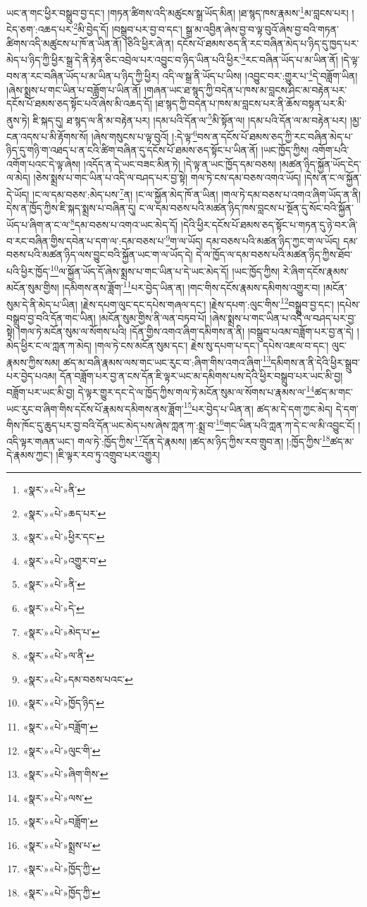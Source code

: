 ཡང་ན་གང་ཕྱིར་བསྒྲུབ་བྱ་དང་། །གཏན་ཚིགས་འདི་མཚུངས་སྒྲ་ཡོད་མིན། །ཐ་སྙད་ཁས་རྣམས་\footnote{«སྣར་»«པེ་»ནི་}མ་བླངས་པར། །ངེད་ཅག་:འཆད་པར་\footnote{«སྣར་»«པེ་»ཆད་པར་}མི་བྱེད་དོ། །བསྒྲུབ་པར་བྱ་བ་དང་། སྒྲ་མ་འབྱིན་ཞེས་བྱ་བ་ལྟ་བུའོ་ཞེས་བྱ་བའི་གཏན་ཚིགས་འདི་མཚུངས་པ་ཁོ་ན་ཡིན་ནོ། །ཅིའི་ཕྱིར་ཞེ་ན། དངོས་པོ་ཐམས་ཅད་ནི་རང་བཞིན་མེད་པ་ཉིད་དུ་ཁྱད་པར་མེད་པ་ཉིད་ཀྱི་ཕྱིར་སྒྲ་དེ་ནི་རྟེན་ཅིང་འབྲེལ་པར་འབྱུང་བ་ཉིད་ཡིན་པའི་ཕྱིར་\footnote{«སྣར་»«པེ་»ཕྱིར་དང་}རང་བཞིན་ཡོད་པ་མ་ཡིན་ནོ། །དེ་ལྟ་བས་ན་རང་བཞིན་ཡོད་པ་མ་ཡིན་པ་ཉིད་ཀྱི་ཕྱིར། འདི་ལ་སྒྲ་ནི་ཡོད་པ་ཡིས། །འབྱུང་བར་:གྱུར་པ་\footnote{«སྣར་»«པེ་»འགྱུར་བ་}དེ་བཟློག་ཡིན། །ཞེས་སྨྲས་པ་གང་ཡིན་པ་བཟློག་པ་ཡིན་ནོ། །གཞན་ཡང་ཐ་སྙད་ཀྱི་བདེན་པ་ཁས་མ་བླངས་ཤིང་མ་བརྟེན་པར་དངོས་པོ་ཐམས་ཅད་སྟོང་པའོ་ཞེས་མི་འཆད་དོ། །ཐ་སྙད་ཀྱི་བདེན་པ་ཁས་མ་བླངས་པར་ནི་ཆོས་བསྟན་པར་མི་ནུས་ཏེ། ཇི་སྐད་དུ། ཐ་སྙད་ལ་ནི་མ་བརྟེན་པར། །དམ་པའི་དོན་ལ་\footnote{«སྣར་»«པེ་»ནི་}མི་སྟོན་ལ། །དམ་པའི་དོན་ལ་མ་བརྟེན་པར། །མྱ་ངན་འདས་པ་མི་རྟོགས་སོ། །ཞེས་གསུངས་པ་ལྟ་བུའོ། །:དེ་ལྟ་\footnote{«སྣར་»«པེ་»དེ་}བས་ན་དངོས་པོ་ཐམས་ཅད་ཀྱི་རང་བཞིན་མེད་པ་ཉིད་དུ་གཉི་ག་འཐད་པ་ན་ངའི་ཚིག་བཞིན་དུ་དངོས་པོ་ཐམས་ཅད་སྟོང་པ་ཡིན་ནོ། །ཡང་ཁྱོད་ཀྱིས། འགོག་པའི་འགོག་པའང་དེ་ལྟ་ཞེས། །འདོད་ན་དེ་ཡང་བཟང་མིན་ཏེ། །དེ་ལྟ་ན་ཡང་ཁྱོད་དམ་བཅས། །མཚན་ཉིད་སྐྱོན་ཡོད་ངེད་ལ་མེད། །ཅེས་སྨྲས་པ་གང་ཡིན་པ་འདི་ལ་བཤད་པར་བྱ་སྟེ། གལ་ཏེ་ངས་དམ་བཅས་འགའ་ཡོད། །དེས་ན་ང་ལ་སྐྱོན་དེ་ཡོད། །ང་ལ་དམ་བཅས་:མེད་པས་\footnote{«སྣར་»«པེ་»མེད་པ་}ན། །ང་ལ་སྐྱོན་མེད་ཁོ་ན་ཡིན། །གལ་ཏེ་དམ་བཅས་པ་འགའ་ཞིག་ཡོད་ན་ནི། དེས་ན་ཁྱོད་ཀྱིས་ཇི་སྐད་སྨྲས་པ་བཞིན་དུ། ང་ལ་དམ་བཅས་པའི་མཚན་ཉིད་ཁས་བླངས་པ་སྔོན་དུ་སོང་བའི་སྐྱོན་ཡོད་པ་ཞིག་ན་ང་ལ་\footnote{«སྣར་»«པེ་»ལ་ནི་}དམ་བཅས་པ་འགའ་ཡང་མེད་དོ། །དེའི་ཕྱིར་དངོས་པོ་ཐམས་ཅད་སྟོང་པ་གཏན་དུ་ཉེ་བར་ཞི་བ་རང་བཞིན་གྱིས་དབེན་པ་དག་ལ་:དམ་བཅས་པ་\footnote{«སྣར་»«པེ་»དམ་བཅས་པའང་}ག་ལ་ཡོད། དམ་བཅས་པའི་མཚན་ཉིད་ཀྱང་ག་ལ་ཡོད། དམ་བཅས་པའི་མཚན་ཉིད་ལས་བྱུང་བའི་སྐྱོན་ཡང་ག་ལ་ཡོད་དེ། དེ་ལ་ཁྱོད་ལ་དམ་བཅས་པའི་མཚན་ཉིད་ཀྱིས་ཐོབ་པའི་ཕྱིར་ཁྱོད་\footnote{«སྣར་»«པེ་»ཁྱོད་ཉིད་}ལ་སྐྱོན་ཡོད་དོ་ཞེས་སྨྲས་པ་གང་ཡིན་པ་དེ་ཡང་མེད་དོ། །ཡང་ཁྱོད་ཀྱིས། རེ་ཞིག་དངོས་རྣམས་མངོན་སུམ་གྱིས། །དམིགས་ནས་ཟློག་\footnote{«སྣར་»«པེ་»བཟློག་}པར་བྱེད་ཡིན་ན། །གང་གིས་དངོས་རྣམས་དམིགས་འགྱུར་བ། །མངོན་སུམ་དེ་ནི་མེད་པ་ཡིན། །རྗེས་དཔག་ལུང་དང་དཔེས་གཞལ་དང་། །རྗེས་དཔག་:ལུང་གིས་\footnote{«སྣར་»«པེ་»ལུང་གི་}བསྒྲུབ་བྱ་དང་། །དཔེས་བསྒྲུབ་བྱ་བའི་དོན་གང་ཡིན། །མངོན་སུམ་གྱིས་ནི་ལན་བཏབ་པོ། །ཞེས་སྨྲས་པ་གང་ཡིན་པ་འདི་ལ་བཤད་པར་བྱ་སྟེ། །གལ་ཏེ་མངོན་སུམ་ལ་སོགས་པའི། །དོན་གྱིས་འགའ་ཞིག་དམིགས་ན་ནི། །བསྒྲུབ་པའམ་བཟློག་པར་བྱ་ན་དེ། །མེད་ཕྱིར་ང་ལ་ཀླན་ཀ་མེད། །གལ་ཏེ་ངས་མངོན་སུམ་དང་། རྗེས་སུ་དཔག་པ་དང་། དཔེས་འཇལ་བ་དང་། ལུང་རྣམས་ཀྱིས་སམ། ཚད་མ་བཞི་རྣམས་ལས་གང་ཡང་རུང་བ་:ཞིག་གིས་འགའ་ཞིག་\footnote{«སྣར་»«པེ་»ཞིག་གིས་}དམིགས་ན་ནི་དེའི་ཕྱིར་སྒྲུབ་པར་བྱེད་པའམ། དོན་བཟློག་པར་བྱ་ན་ངས་དོན་ཇི་ལྟར་ཡང་མ་དམིགས་པས་དེའི་ཕྱིར་བསྒྲུབ་པར་ཡང་མི་བྱ། བཟློག་པར་ཡང་མི་བྱ། དེ་ལྟར་གྱུར་དང་དེ་ལ་ཁྱོད་ཀྱིས་གལ་ཏེ་མངོན་སུམ་ལ་སོགས་པ་རྣམས་ལ་\footnote{«སྣར་»«པེ་»ལས་}ཚད་མ་གང་ཡང་རུང་བ་ཞིག་གིས་དངོས་པོ་རྣམས་དམིགས་ནས་ཟློག་\footnote{«སྣར་»«པེ་»བཟློག་}པར་བྱེད་པ་ཡིན་ན། ཚད་མ་དེ་དག་ཀྱང་མེད། དེ་དག་གིས་ཁོང་དུ་ཆུད་པར་བྱ་བའི་དོན་ཡང་མེད་པས་ཞེས་ཀླན་ཀ་:སྨྲ་བ་\footnote{«སྣར་»«པེ་»སྨྲས་པ་}གང་ཡིན་པའི་ཀླན་ཀ་དེ་ང་ལ་མི་འབྱུང་ངོ། །འདི་ལྟར་གཞན་ཡང་། གལ་ཏེ་:ཁྱོད་ཀྱིས་\footnote{«སྣར་»«པེ་»ཁྱོད་ཀྱི་}དོན་དེ་རྣམས། །ཚད་མ་ཉིད་ཀྱིས་རབ་གྲུབ་ན། །:ཁྱོད་ཀྱིས་\footnote{«སྣར་»«པེ་»ཁྱོད་ཀྱི་}ཚད་མ་དེ་རྣམས་ཀྱང་། །ཇི་ལྟར་རབ་ཏུ་འགྲུབ་པར་འགྱུར། 